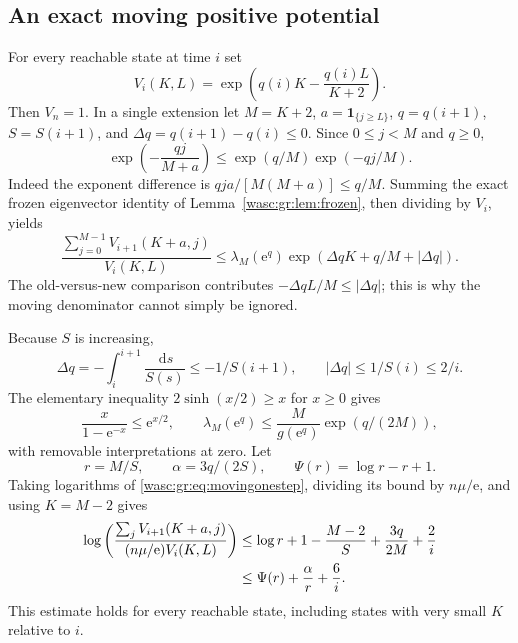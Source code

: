 \documentclass[11pt,a4paper]{article}
\theoremstyle{remark}\newtheorem{remark}[theorem]{Remark}
\newcommand{\ind}{\mathbf 1}\newcommand{\wasc}{\operatorname{wasc}}\newcommand{\dasc}{\operatorname{dasc}}
\newcommand{\dd}{\,\mathrm d}\newcommand{\ee}{\mathrm e}\newcommand{\Wc}{\mathcal W}
\numberwithin{equation}{section}
\begin{document}
\subsection{An exact moving positive potential}
For every reachable state at time $i$ set
\begin{equation}\label{wasc:gr:eq:potential}
V_i(K,L)=\exp\!\left(q(i)K-\frac{q(i)L}{K+2}\right).
\end{equation}
Then $V_n=1$. In a single extension let $M=K+2$, $a=\ind_{\{j\ge L\}}$, $q=q(i+1)$, $S=S(i+1)$, and $\Delta q=q(i+1)-q(i)\le0$. Since $0\le j<M$ and $q\ge0$,
\begin{equation}\label{wasc:gr:eq:denominatorloss}
\exp\!\left(-\frac{qj}{M+a}\right)
\le\exp(q/M)\exp(-qj/M).
\end{equation}
Indeed the exponent difference is $qja/[M(M+a)]\le q/M$. Summing the exact frozen eigenvector identity of Lemma~\ref{wasc:gr:lem:frozen}, then dividing by $V_i$, yields
\begin{equation}\label{wasc:gr:eq:movingonestep}
\frac{\sum_{j=0}^{M-1}V_{i+1}(K+a,j)}{V_i(K,L)}
\le\lambda_M(\ee^q)\exp(\Delta qK+q/M+|\Delta q|).
\end{equation}
The old-versus-new comparison contributes $-\Delta q L/M\le|\Delta q|$; this is why the moving denominator cannot simply be ignored.

Because $S$ is increasing,
\begin{equation}\label{wasc:gr:eq:qdecrement}
\Delta q=-\int_i^{i+1}\frac{\dd s}{S(s)}\le-1/S(i+1),
\qquad |\Delta q|\le1/S(i)\le2/i.
\end{equation}
The elementary inequality $2\sinh(x/2)\ge x$ for $x\ge0$ gives
\[
\frac{x}{1-\ee^{-x}}\le\ee^{x/2},
\qquad
\lambda_M(\ee^q)\le\frac{M}{g(\ee^q)}\exp(q/(2M)),
\]
with removable interpretations at zero. Let
\begin{equation}\label{wasc:gr:eq:ralpha}
r=M/S,\qquad \alpha=3q/(2S),\qquad \Psi(r)=\log r-r+1.
\end{equation}
Taking logarithms of \eqref{wasc:gr:eq:movingonestep}, dividing its bound by $n\mu/\ee$, and using $K=M-2$ gives
\begin{align}\label{wasc:gr:eq:globalstep}
\log\left(\frac{\sum_jV_{i+1}(K+a,j)}{(n\mu/\ee)V_i(K,L)}\right)
&\le \log r+1-\frac{M-2}{S}+\frac{3q}{2M}+\frac2i\notag\\
&\le\Psi(r)+\frac\alpha r+\frac6i.
\end{align}
This estimate holds for every reachable state, including states with very small $K$ relative to $i$.
\end{document}
